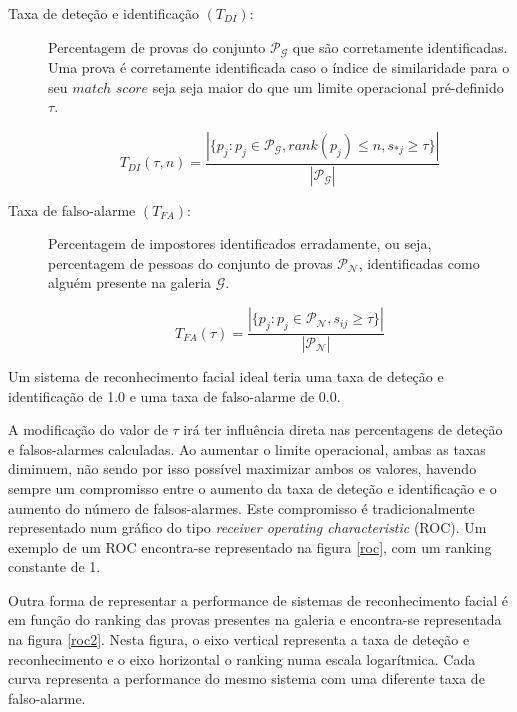  \begin{description}
 \item[Taxa de deteção e identificação $(T_{DI})$:] Percentagem de provas do conjunto $\mathscr{P}_\mathscr{G}$ que são corretamente  identificadas. Uma prova é corretamente identificada caso o índice de similaridade para o seu $match$ $score$ seja seja maior do que um limite operacional pré-definido $\tau$.

\begin{equation}
 T_{DI}(\tau, n) = \frac{|\{p_j:p_j \in \mathscr{P}_\mathscr{G}, rank(p_j) \leqslant n, s_{*j} \geqslant \tau\}|}{|\mathscr{P}_\mathscr{G}|}
\end{equation}
 
  \item[Taxa de falso-alarme $(T_{FA})$:] Percentagem de impostores identificados erradamente, ou seja, percentagem de pessoas do conjunto de provas $\mathscr{P}_\mathscr{N}$, identificadas como alguém presente na galeria $\mathscr{G}$.
  
\begin{equation}
 T_{FA}(\tau) = \frac{|\{p_j:p_j \in \mathscr{P}_\mathscr{N}, s_{ij} \geqslant \tau\}|}{|\mathscr{P}_\mathscr{N}|}
\end{equation}

\end{description}

Um sistema de reconhecimento facial ideal teria uma taxa de deteção e identificação de 1.0 e uma taxa de falso-alarme de 0.0.

A modificação do valor de $\tau$ irá ter influência direta nas percentagens de deteção e falsos-alarmes calculadas. Ao aumentar o limite operacional, ambas as taxas diminuem, não sendo por isso possível maximizar ambos os valores, havendo sempre um compromisso entre o aumento da taxa de deteção e identificação e o aumento do número de falsos-alarmes. Este compromisso é tradicionalmente representado num gráfico do tipo \textit{receiver operating characteristic} (ROC). Um exemplo de um ROC encontra-se representado na figura \ref{roc}, com um ranking constante de 1. 

Outra forma de representar a performance de sistemas de reconhecimento facial é em função do ranking das provas presentes na galeria e encontra-se representada na figura \ref{roc2}. Nesta figura, o eixo vertical representa a taxa de deteção e reconhecimento e o eixo horizontal o ranking numa escala logarítmica. Cada curva representa a performance do mesmo sistema com uma diferente taxa de falso-alarme.

